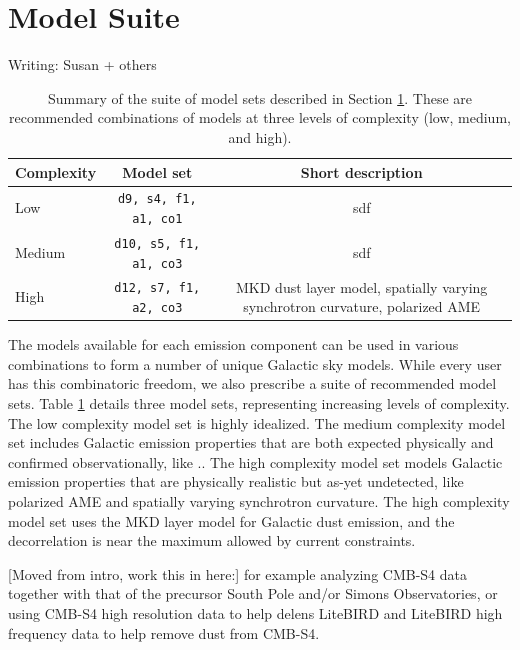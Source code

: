\documentclass[twocolumn]{aastex631}
\begin{document}
\section{Model Suite}\label{sec:modelsuite}
Writing: Susan + others
\begin{table}[]
    \centering
    \begin{tabular}{lcc}
    
    \toprule 
    Complexity & Model set & Short description \\
    \midrule
    Low  & \texttt{d9, s4, f1, a1, co1} & sdf  \\
    Medium  & \texttt{d10, s5, f1, a1, co3} & sdf   \\
    High  & \texttt{d12, s7, f1, a2, co3} & MKD dust layer model, spatially varying synchrotron curvature, polarized AME  \\
   
   \bottomrule
    \end{tabular}
    \caption{Summary of the suite of model sets described in Section \ref{sec:modelsuite}. These are recommended combinations of models at three levels of complexity (low, medium, and high).  }
    \label{tab:modelsuite}
\end{table}

The models available for each emission component can be used in various combinations to form a number of unique Galactic sky models. While every user has this combinatoric freedom, we also prescribe a suite of recommended model sets. Table \ref{tab:modelsuite} details three model sets, representing increasing levels of complexity. The low complexity model set is highly idealized.
The medium complexity model set includes Galactic emission properties that are both expected physically and confirmed observationally, like ..
The high complexity model set models Galactic emission properties that are physically realistic but as-yet undetected, like polarized AME and spatially varying synchrotron curvature. The high complexity model set uses the MKD layer model for Galactic dust emission, and the decorrelation is near the maximum allowed by current constraints.  


[Moved from intro, work this in here:]
for example analyzing CMB-S4 data together with that of the precursor South Pole and/or Simons Observatories, or using CMB-S4 high resolution data to help delens LiteBIRD and LiteBIRD high frequency data to help remove dust from CMB-S4.
\end{document}
